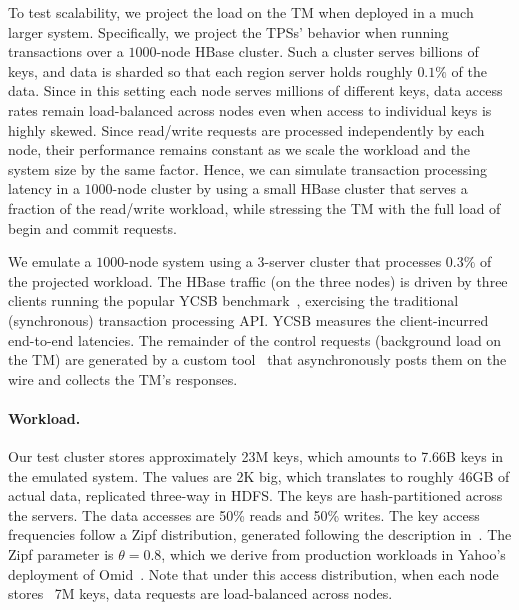 To test scalability, we project the load on the TM when deployed in a much larger system. 
Specifically, we project the TPSs' behavior when running transactions over a $1000$-node HBase cluster.
Such a cluster serves billions of keys, and data is sharded so that each region server 
holds roughly $0.1\%$ of the data.
Since in this setting each node serves millions of different keys, 
data access rates remain load-balanced across nodes 
even when access to individual keys is highly skewed. 
Since read/write requests are processed independently by each node, 
their performance remains constant as we scale the workload and the 
system size by the same factor. 
Hence, we can simulate transaction processing latency in 
a $1000$-node cluster
by using a small HBase cluster that serves a fraction of the read/write workload, 
while stressing the TM with the full load of begin and commit requests. 

We emulate a $1000$-node system using a $3$-server cluster that processes $0.3\%$ of the projected workload. 
The HBase traffic (on the three nodes) is driven by three clients running the popular YCSB benchmark~\cite{Cooper:2010:BCS:1807128.1807152}, 
exercising the traditional (synchronous) transaction processing API. YCSB measures the client-incurred end-to-end latencies.
The remainder of the control requests (background load on the TM) are generated by a custom tool~\cite{Omid2017} 
that asynchronously posts them on the wire and collects the TM's responses. 

\paragraph{Workload.}

Our test cluster stores approximately 23M keys, which amounts to 7.66B keys in the emulated system. 
The values are 2K big, which translates to roughly 46GB of actual data, replicated three-way in HDFS. The keys are hash-partitioned
across the servers. The data accesses are 50\% reads and 
50\% writes. The key access frequencies follow a Zipf distribution, generated following 
the description in~\cite{Gray:1994:QGB:191839.191886}. The Zipf parameter is $\theta=0.8$, which we derive from production 
workloads in Yahoo's deployment of Omid~\cite{Omid2017}. 
Note that under this access distribution, when each node stores ~7M keys, data requests are load-balanced across nodes.

